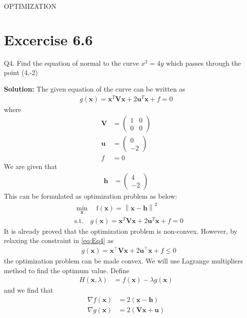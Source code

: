 \documentclass[12pt]{article}
\providecommand{\brak}[1]{\ensuremath{\left(#1\right)}}
\providecommand{\norm}[1]{\left\lVert#1\right\rVert}
\newcommand{\solution}{\noindent \textbf{Solution: }}
\newcommand{\myvec}[1]{\ensuremath{\begin{pmatrix}#1\end{pmatrix}}}
\let\vec\mathbf
\begin{document}
\begin{center}
\textbf\large{OPTIMIZATION}

\end{center}
\section*{Excercise 6.6}

Q4. Find the equation of normal to the curve $x^2=4y$ which passes through the point (4,-2)

\solution
The given equation of the curve can be written as  
\begin{align}
	\label{eq:parabolaEq2}
	g\brak{\vec{x}} = \vec{x}^T\vec{V}\vec{x} + 2\vec{u}^T\vec{x} + f = 0 
\end{align}
where
\begin{align}
	\label{eq:eqV}
	\vec{V} &= \myvec{ 1 & 0 \\ 0 & 0} \\
	\label{eq:eqU}
	\vec{u} &= \myvec{0 \\ -2} \\
	\label{eq:eqF}
	f &= 0 
\end{align}
We are given that 
\begin{align}
	\vec{h} &= \myvec{4 \\ -2}
\end{align}
This can be formulated as optimization problem as below:
\begin{align}
	\label{eq:Eq3}
	&  \min_{\vec{x}} \quad \text{f}\brak{\vec{x}} = \norm{\vec{x}-\vec{h}}^2\\
	\label{eq:Eq4}
	& \text{s.t.}\quad g\brak{\vec{x}} = \vec{x}^T\vec{V}\vec{x} + 2\vec{u}^T\vec{x} + f = 0  
\end{align}
It is already proved that the optimization problem is non-convex. However, by relaxing the constraint in \eqref{eq:Eq4} as
\begin{align}
	\label{eq:Eq7}
	& g\brak{\vec{x}} = \vec{x}^\top\vec{V}\vec{x} + 2\vec{u}^\top\vec{x} + f \le 0  
\end{align}
the optimization problem can be made convex.
We will use Lagrange multipliers method to find the optimum value. Define
\begin{align}
	H\brak{\vec{x}, \lambda} &= f\brak{\vec{x}} - \lambda g\brak{\vec{x}} 
\end{align}
and we find that 
\begin{align}
	\nabla f\brak{\vec{x}} &= 2\brak{\vec{x}-\vec{h}} \\
	\nabla g\brak{\vec{x}} &= 2\brak{\vec{V}\vec{x}+\vec{u}}
\end{align}
\end{document}
